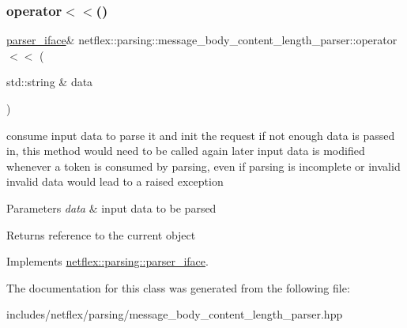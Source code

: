 \subsubsection{\texorpdfstring{operator$<$$<$()}{operator<<()}}
{\footnotesize\ttfamily \hyperlink{classnetflex_1_1parsing_1_1parser__iface}{parser\+\_\+iface}\& netflex\+::parsing\+::message\+\_\+body\+\_\+content\+\_\+length\+\_\+parser\+::operator$<$$<$ (\begin{DoxyParamCaption}\item[{std\+::string \&}]{data }\end{DoxyParamCaption})\hspace{0.3cm}{\ttfamily [virtual]}}

consume input data to parse it and init the request if not enough data is passed in, this method would need to be called again later input data is modified whenever a token is consumed by parsing, even if parsing is incomplete or invalid invalid data would lead to a raised exception


\begin{DoxyParams}{Parameters}
{\em data} & input data to be parsed \\
\hline
\end{DoxyParams}
\begin{DoxyReturn}{Returns}
reference to the current object 
\end{DoxyReturn}


Implements \hyperlink{classnetflex_1_1parsing_1_1parser__iface_a6b092567e70a5c0bf7568e94d06f7154}{netflex\+::parsing\+::parser\+\_\+iface}.



The documentation for this class was generated from the following file\+:\begin{DoxyCompactItemize}
\item 
includes/netflex/parsing/message\+\_\+body\+\_\+content\+\_\+length\+\_\+parser.\+hpp\end{DoxyCompactItemize}
